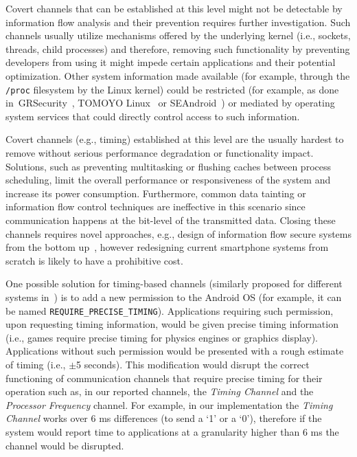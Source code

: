  Covert channels that
can be established at this level might not be detectable by
information flow analysis and their prevention requires further
investigation. Such channels usually utilize mechanisms offered by the
underlying kernel (i.e., sockets, threads, child processes) and
therefore, removing such functionality by preventing developers from
using it might impede certain applications and their potential
optimization. Other system information made available (for example,
through the \texttt{/proc} filesystem by the Linux kernel) could be
restricted (for example, as done in~GRSecurity~\cite{grsecurity},
TOMOYO Linux~\cite{tomoyo} or SEAndroid~\cite{seandroid}) or mediated
by operating system services that could directly control access to
such information.

 Covert channels (e.g.,
timing) established at this level are the usually hardest to remove
without serious performance degradation or functionality
impact. Solutions, such as preventing multitasking or flushing caches
between process scheduling, limit the overall performance or
responsiveness of the system and increase its power
consumption. Furthermore, common data tainting or information flow
control techniques are ineffective in this scenario since
communication happens at the bit-level of the transmitted
data. Closing these channels requires novel approaches, e.g., design
of information flow secure systems from the bottom
up~\cite{crafting_etc_information_flow}, however redesigning current
smartphone systems from scratch is likely to have a prohibitive cost.

One possible solution for timing-based channels (similarly proposed
for different systems
in~\cite{Reducing_timing_channels_with_fuzzy_time}) is to add a new
permission to the Android OS (for example, it can be named
\texttt{REQUIRE\_PRECISE\_TIMING}). Applications requiring such
permission, upon requesting timing information, would be given precise
timing information (i.e., games require precise timing for physics
engines or graphics display). Applications without such permission
would be presented with a rough estimate of timing (i.e., $\pm$5
seconds). This modification would disrupt the correct functioning of
communication channels that require precise timing for their operation
such as, in our reported channels, the \emph{Timing Channel} and the
\emph{Processor Frequency} channel. For example, in our implementation
the \emph{Timing Channel} works over 6 ms differences (to send a `1'
or a `0'), therefore if the system would report time to applications
at a granularity higher than 6 ms the channel would be disrupted.

